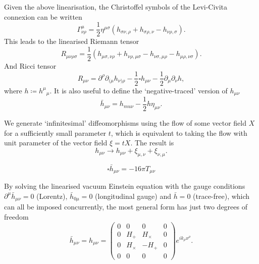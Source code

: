 \documentclass[12pt]{article}
\begin{document}
\begin{noteEquation}
Given the above linearisation, the Christoffel symbols of the Levi-Civita connexion can be written
\begin{equation}
\Gamma^\mu_{\nu\rho} = \frac{1}{2}
\eta^{\mu\sigma} (h_{\sigma \nu,\rho} + h_{\sigma \rho, \nu} - h_{\nu\rho, \sigma} ).
\end{equation}
This leads to the linearised Riemann tensor
\begin{equation}
R_{\mu\nu\rho\sigma} = \frac{1}{2}(h_{\mu\sigma, \nu\rho} + h_{\nu\rho,\mu\sigma} - h_{\nu\sigma, \mu\rho} - h_{\mu\rho, \nu\sigma}).
\end{equation}
And Ricci tensor
\begin{equation}
R_{\mu\nu} = \partial^\rho \partial_{(\mu} h_{\nu)\rho} - \frac{1}{2} \square h_{\mu\nu} - \frac{1}{2} \partial_\mu \partial_\nu h,
\end{equation}
where $h \coloneqq {h^\mu}_\mu$. It is also useful to define the `negative-traced' version of $h_{\mu\nu}$
\begin{equation}
\bar{h}_{\mu\nu} = h_{mu\nu} - \frac{1}{2}h\eta_{\mu\nu}.
\end{equation}
\end{noteEquation}

\begin{noteEquation}
We generate `infinitesimal' diffeomorphisms using the flow of some vector field $X$ for a sufficiently small parameter $t$, which is equivalent to taking the flow with unit parameter of the vector field $\xi = tX$. The result is
\begin{equation}
h_{\mu\nu} \to h_{\mu\nu} + \xi_{\mu,\nu} + \xi_{\nu,\mu}.
\end{equation}
\end{noteEquation}

\begin{noteEquation}
\begin{equation}
\square \bar{h}_{\mu\nu} = -16 \pi T_{\mu\nu}
\end{equation}
\end{noteEquation}

\begin{noteEquation}
By solving the linearised vacuum Einstein equation with the gauge conditions $\partial^\mu \bar{h}_{\mu\nu} = 0$ (Lorentz), $\bar{h}_{0\mu} = 0$ (longitudinal gauge) and $\bar{h} = 0$ (trace-free), which can all be imposed concurrently, the most general form has just two degrees of freedom
\begin{equation}
\bar{h}_{\mu\nu} = h_{\mu\nu} = \begin{pmatrix}
0&0&0&0 \\
0 & H_+   &  H_\times & 0 \\
0 & H_\times & - H_+   & 0 \\
0&0&0&0
\end{pmatrix} e^{i k_\rho x^\rho}.
\end{equation}
\end{noteEquation}
\end{document}
